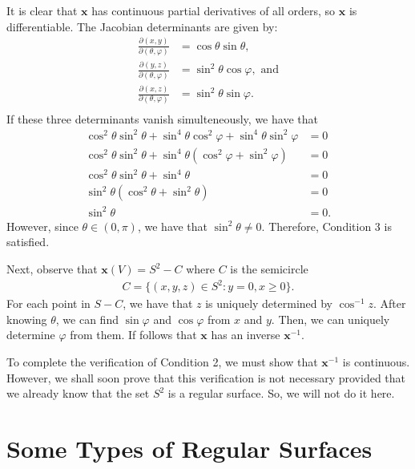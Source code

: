 \documentclass[10pt]{article}
\newcommand{\ve}[1]{\mathbf{#1}}
\begin{document}
\begin{itemize}
    It is clear that $\ve{x}$ has continuous partial derivatives of all orders, so $\ve{x}$ is differentiable. The Jacobian determinants are given by:
    \begin{align*}
      \frac{\partial(x,y)}{\partial(\theta, \varphi)} &= \cos \theta \sin \theta,\\
      \frac{\partial(y,z)}{\partial(\theta, \varphi)} &= \sin^2 \theta \cos \varphi,\mbox{ and}\\
      \frac{\partial(x,z)}{\partial(\theta, \varphi)} &= \sin^2 \theta \sin \varphi.\\
    \end{align*}
    If these three determinants vanish simulteneously, we have that
    \begin{align*}
      \cos^2 \theta \sin^2 \theta + \sin^4 \theta \cos^2 \varphi + \sin^4 \theta \sin^2 \varphi &= 0\\
      \cos^2 \theta \sin^2 \theta + \sin^4 \theta (\cos^2 \varphi + \sin^2 \varphi) &= 0\\
      \cos^2 \theta \sin^2 \theta + \sin^4 \theta &= 0\\
      \sin^2 \theta(\cos^2 \theta + \sin^2 \theta) &= 0\\
      \sin^2 \theta &= 0.
    \end{align*}
    However, since $\theta \in (0, \pi)$, we have that $\sin^2 \theta \neq 0$. Therefore, Condition 3 is satisfied.

    Next, observe that $\ve{x}(V) = S^2 - C$ where $C$ is the semicircle
    \begin{align*}
      C = \{ (x,y,z) \in S^2 : y = 0, x \geq 0 \}.
    \end{align*}
    For each point in $S-C$, we have that $z$ is uniquely determined by $\cos^{-1} z$. After knowing $\theta$, we can find $\sin \varphi$ and $\cos \varphi$ from $x$ and $y$. Then, we can uniquely determine $\varphi$ from them. If follows that $\ve{x}$ has an inverse $\ve{x}^{-1}$.

    To complete the verification of Condition 2, we must show that $\ve{x}^{-1}$ is continuous. However, we shall soon prove that this verification is not necessary provided that we already know that the set $S^2$ is a regular surface. So, we will not do it here.  
  \end{itemize}  

  \section{Some Types of Regular Surfaces} %
  \label{sec:some_types_of_regular_surfaces}
  
\end{document}

